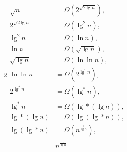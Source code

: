 \begin{alignat*}{2}
\begin{aligned}
		\sqrt{n} &= \Omega \left(2^{\sqrt{2 \lg n}} \right), \\
		2^{\sqrt{2 \lg n}} &= \Omega \left(\lg ^2 n \right), \\
		\lg ^2 n &= \Omega \left(\ln n \right), \\
		\ln n &= \Omega \left(\sqrt{\lg n} \right), \\
		\sqrt{\lg n} &= \Omega \left(\ln \ln n \right), \\
		\ln \ln n &= \Omega \left(2^{\lg ^* n} \right), \\
		2^{\lg ^* n} &= \Omega \left(\lg ^* n \right), \\
		\lg ^* n &= \Omega \left(\lg * (\lg n) \right), \\
		\lg * (\lg n) &= \Omega \left(\lg (\lg * n) \right), \\
		\lg (\lg * n) &= \Omega \left(n^{\frac{1}{\lg n}} \right), \\
		& n^{\frac{1}{\lg n}}
	\end{aligned}
\end{alignat*}

